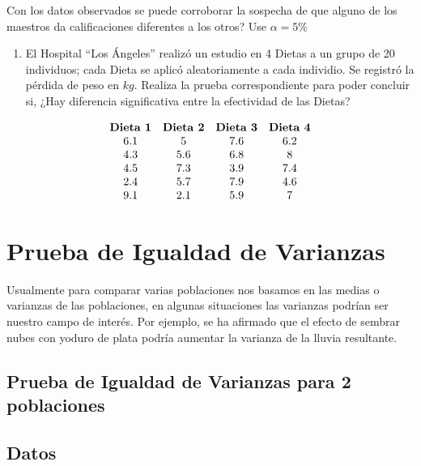 \documentclass[
  a4paper,
  oneside,
  openany]{book}
\providecommand{\tightlist}{%
  \setlength{\itemsep}{0pt}\setlength{\parskip}{0pt}}
\begin{document}
Con los datos observados se puede corroborar la sospecha de que alguno de los maestros da calificaciones diferentes a los otros? Use \(\alpha=5\%\)

\begin{enumerate}
\def\labelenumi{\arabic{enumi}.}
\setcounter{enumi}{2}
\tightlist
\item
  El Hospital ``Los Ángeles'' realizó un estudio en 4 Dietas a un grupo de 20 individuos; cada Dieta se aplicó aleatoriamente a cada individio. Se registró la pérdida de peso en \(kg\).
  Realiza la prueba correspondiente para poder concluir si, ¿Hay diferencia significativa entre la efectividad de las Dietas?
\end{enumerate}

\[
\begin{array}{c c c c} 
\textbf{Dieta 1} & \textbf{Dieta 2} & \textbf{Dieta 3} & \textbf{Dieta 4}\\
6.1&5&7.6&6.2\\
4.3&5.6&6.8&8\\
4.5&7.3&3.9&7.4\\
2.4&5.7&7.9&4.6\\
9.1&2.1&5.9&7\\
\end{array}
\]

\hypertarget{prueba-de-igualdad-de-varianzas}{%
\chapter{Prueba de Igualdad de Varianzas}\label{prueba-de-igualdad-de-varianzas}}

Usualmente para comparar varias poblaciones nos basamos en las medias o varianzas de las poblaciones, en algunas situaciones las varianzas podrían ser nuestro campo de interés. Por ejemplo, se ha afirmado que el efecto de sembrar nubes con yoduro de plata podría aumentar la varianza de la lluvia resultante.

\hypertarget{prueba-de-igualdad-de-varianzas-para-2-poblaciones}{%
\section*{Prueba de Igualdad de Varianzas para 2 poblaciones}\label{prueba-de-igualdad-de-varianzas-para-2-poblaciones}}


\hypertarget{datos-8}{%
\section{Datos}\label{datos-8}}
\end{document}
